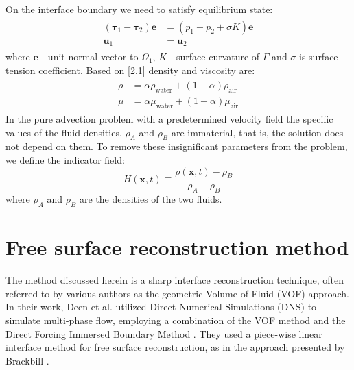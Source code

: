 On the interface boundary we need to satisfy equilibrium state:
\begin{equation}
\begin{array}{c}
\begin{aligned}
\left(\boldsymbol{\tau}_{1}-\boldsymbol{\tau}_{2}\right) \mathbf{e}&=\left(p_{1}-p_{2}+\sigma K\right) \mathbf{e} \\
\mathbf{u}_{1} &=\mathbf{u}_{2}
\end{aligned}
\end{array}
\end{equation}
where $\mathbf{e}$ - unit normal vector to $\Omega_1$, $K$ - surface curvature of $\Gamma$ and $\sigma$ is surface tension coefficient. Based on \ref{2.1} density and viscosity are:
\begin{equation}
\begin{array}{c}
\begin{aligned}
        \rho &= \alpha \rho_{\text {water}}+(1-\alpha) \rho_{\text {air}} \\
        \mu &= \alpha \mu_{\text {water}}+(1-\alpha) \mu_{\text {air}}
\end{aligned}
\end{array}
\end{equation}
In the pure advection problem with a predetermined velocity field the specific values of the fluid densities, $\rho_A$ and $\rho_B$ are immaterial, that is, the solution does not depend on them. To remove these insignificant parameters from the problem, we define the indicator field:
\begin{equation}
H(\mathbf{x}, t) \equiv \frac{\rho(\mathbf{x}, t)-\rho_{B}}{\rho_{A}-\rho_{B}}
\end{equation}
where $\rho_{A}$ and $\rho_{B}$ are the densities of the two fluids.

\section{Free surface reconstruction method}

The method discussed herein is a sharp interface reconstruction technique, often referred to by various authors as the geometric Volume of Fluid (VOF) approach. In their work, Deen et al. \cite{deen2009direct} utilized Direct Numerical Simulations (DNS) to simulate multi-phase flow, employing a combination of the VOF method \cite{hirt1981vof} and the Direct Forcing Immersed Boundary Method \cite{uhlmann2005immersed}. They used a piece-wise linear interface method for free surface reconstruction, as in the approach presented by Brackbill \cite{brackbill1992continuum}.

